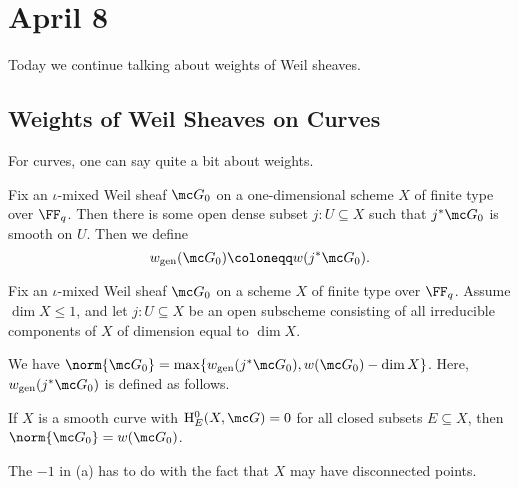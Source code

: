 \documentclass[../notes.tex]{subfiles}
\begin{document}
\section{April 8}
Today we continue talking about weights of Weil sheaves.

\subsection{Weights of Weil Sheaves on Curves}
For curves, one can say quite a bit about weights.
\begin{definition}
	Fix an $\iota$-mixed Weil sheaf $\mc G_0$ on a one-dimensional scheme $X$ of finite type over $\FF_q$. Then there is some open dense subset $j\colon U\subseteq X$ such that $j^*\mc G_0$ is smooth on $U$. Then we define
	\[w_{\mathrm{gen}}(\mc G_0)\coloneqq w(j^*\mc G_0).\]
\end{definition}
\begin{theorem} \label{thm:weight-on-curves}
	Fix an $\iota$-mixed Weil sheaf $\mc G_0$ on a scheme $X$ of finite type over $\FF_q$. Assume $\dim X\le1$, and let $j\colon U\subseteq X$ be an open subscheme consisting of all irreducible components of $X$ of dimension equal to $\dim X$.
	\begin{listalph}
		\item We have $\norm{\mc G_0}=\max\{w_{\mathrm{gen}}(j^*\mc G_0),w(\mc G_0)-\dim X\}$. Here, $w_{\mathrm{gen}}(j^*\mc G_0)$ is defined as follows.
		\item If $X$ is a smooth curve with $\mathrm H^0_E(X,\mc G)=0$ for all closed subsets $E\subseteq X$, then $\norm{\mc G_0}=w(\mc G_0)$.
	\end{listalph}
\end{theorem}
\begin{remark}
	The $-1$ in (a) has to do with the fact that $X$ may have disconnected points.
\end{remark}
\end{document}
